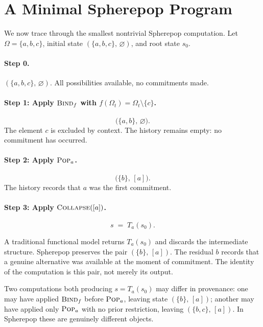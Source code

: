 \documentclass[12pt]{article}
\newcommand{\Pop}{\operatorname{\textsc{Pop}}}
\newcommand{\Bind}{\operatorname{\textsc{Bind}}}
\newcommand{\Collapse}{\operatorname{\textsc{Collapse}}}
\newcommand{\Option}{\Omega}
\newcommand{\Seq}[1]{\left[#1\right]}
\begin{document}
\section{A Minimal Spherepop Program}
\label{sec:example}

We now trace through the smallest nontrivial Spherepop computation. Let $\Option = \{a, b, c\}$, initial state $(\{a,b,c\},\, \varnothing)$, and root state $s_0$.

\paragraph{Step 0.} $(\{a,b,c\},\, \varnothing)$. All possibilities available, no commitments made.

\paragraph{Step 1: Apply $\Bind_f$ with $f(\Option_t) = \Option_t \setminus \{c\}$.}
\[
\bigl(\{a,b\},\, \varnothing\bigr).
\]
The element $c$ is excluded by context. The history remains empty: no commitment has occurred.

\paragraph{Step 2: Apply $\Pop_a$.}
\[
\bigl(\{b\},\, \Seq{a}\bigr).
\]
The history records that $a$ was the first commitment.

\paragraph{Step 3: Apply $\Collapse(\Seq{a})$.}
\[
s \;=\; T_a(s_0).
\]

A traditional functional model returns $T_a(s_0)$ and discards the intermediate structure. Spherepop preserves the pair $(\{b\},\, \Seq{a})$. The residual $b$ records that a genuine alternative was available at the moment of commitment. The identity of the computation is this pair, not merely its output.

Two computations both producing $s = T_a(s_0)$ may differ in provenance: one may have applied $\Bind_f$ before $\Pop_a$, leaving state $(\{b\},\, \Seq{a})$; another may have applied only $\Pop_a$ with no prior restriction, leaving $(\{b,c\},\, \Seq{a})$. In Spherepop these are genuinely different objects.
\end{document}
